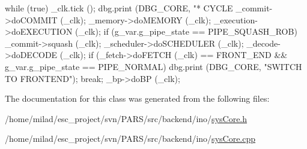 \begin{DoxyCode}
                       {
        while (true) {
                _clk.tick ();
        dbg.print (DBG_CORE, "\n** CYCLE %
            _commit->doCOMMIT (_clk);
            _memory->doMEMORY (_clk);
            _execution->doEXECUTION (_clk);
        if (g_var.g_pipe_state == PIPE_SQUASH_ROB) _commit->squash (_clk);
            _scheduler->doSCHEDULER (_clk);
            _decode->doDECODE (_clk);
            if (_fetch->doFETCH (_clk) == FRONT_END && g_var.g_pipe_state == 
      PIPE_NORMAL) {
            dbg.print (DBG_CORE, "SWITCH TO FRONTEND\n");
            break;
        }
        _bp->doBP (_clk);
        }
}
\end{DoxyCode}


The documentation for this class was generated from the following files:\begin{DoxyCompactItemize}
\item 
/home/milad/esc\_\-project/svn/PARS/src/backend/ino/\hyperlink{ino_2sysCore_8h}{sysCore.h}\item 
/home/milad/esc\_\-project/svn/PARS/src/backend/ino/\hyperlink{ino_2sysCore_8cpp}{sysCore.cpp}\end{DoxyCompactItemize}
